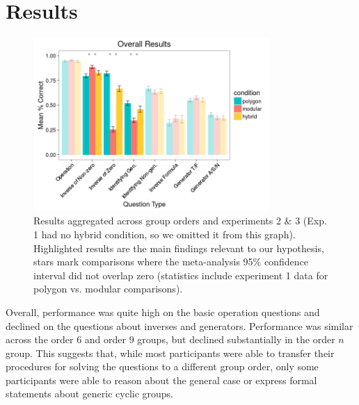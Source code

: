 \documentclass[man,mask,10pt]{apa6}
\begin{document}
\section{Results}
\begin{figure}
\centering
\includegraphics[width=0.8\textwidth]{figures/overall_results.png}
\caption{Results aggregated across group orders and experiments 2 \& 3 (Exp. 1 had no hybrid condition, so we omitted it from this graph). Highlighted results are the main findings relevant to our hypothesis, stars mark comparisons where the meta-analysis 95\% confidence interval did not overlap zero (statistics include experiment 1 data for polygon vs. modular comparisons).}
\label{overall_results}
\end{figure}
Overall, performance was quite high on the basic operation questions and declined on the questions about inverses and generators. Performance was similar across the order 6 and order 9 groups, but declined substantially in the order $n$ group. This suggests that, while most participants were able to transfer their procedures for solving the questions to a different group order, only some participants were able to reason about the general case or express formal statements about generic cyclic groups.\par
\end{document}
